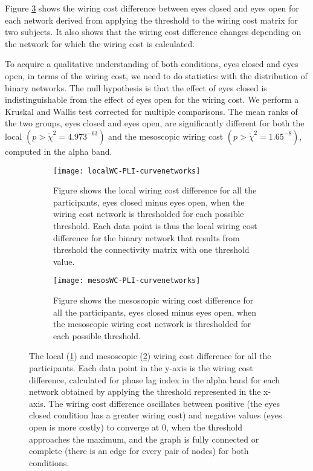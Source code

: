 \documentclass[11pt, onecolumn]{article}
\begin{document}
Figure \ref{fig:wcindivpats} shows the wiring cost difference between eyes closed and eyes open for each network derived from applying the threshold to the wiring cost matrix for two subjects.
It also shows that the wiring cost difference changes depending on the network for which the wiring cost is calculated. 

To acquire a qualitative understanding of both conditions, eyes closed and eyes open, in terms of the wiring cost, we need to do statistics with the distribution of binary networks.
The null hypothesis is that the effect of eyes closed is indistinguishable from the effect of eyes open for the wiring cost.
We perform a Kruskal and Wallis test corrected for multiple comparisons. The mean ranks of the two groups, eyes closed and eyes open, are significantly different for both the local $(p > \tilde{\chi}^2 = 4.973^{-63})$ and the mesoscopic wiring cost $(p > \tilde{\chi}^2 = 1.65^{-8})$, computed in the alpha band.


\begin{figure}[ht] 
  \begin{subfigure}[t]{0.5\linewidth}
    \centering
    \texttt{[image: localWC-PLI-curvenetworks]} 
    \caption{Figure shows the local wiring cost difference for all the participants, eyes closed minus eyes open, when the wiring cost network is thresholded for each possible threshold. Each data point is thus the local wiring cost difference for the binary network that results from threshold the connectivity matrix with one threshold value.} 
    \label{fig:wcindivpats:a} 
    \vspace{4ex}
  \end{subfigure}%
  \hspace{1ex}
  \begin{subfigure}[t]{0.5\linewidth} \hfill
    \centering
    \texttt{[image: mesosWC-PLI-curvenetworks]} 
    \caption{Figure shows the mesoscopic wiring cost difference for all the participants, eyes closed minus eyes open, when the mesoscopic wiring cost network is thresholded for each possible threshold.} 
    \label{fig:wcindivpats:b} 
    \vspace{4ex}
  \end{subfigure} 
  \caption{The local (\ref{fig:wcindivpats:a}) and mesoscopic (\ref{fig:wcindivpats:b}) wiring cost difference for all the participants. Each data point in the y-axis is the wiring cost difference, calculated for phase lag index in the alpha band for each network obtained by applying the threshold represented in the x-axis.
The wiring cost difference oscillates between positive (the eyes closed condition has a greater wiring cost) and negative values (eyes open is more costly) to converge at 0, when the threshold approaches the maximum, and the graph is fully connected or complete (there is an edge for every pair of nodes) for both conditions.}
  \label{fig:wcindivpats} 
\end{figure}
\end{document}
